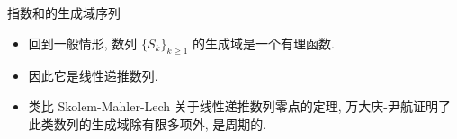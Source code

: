 \documentclass[aspectratio=169,handout]{ctexbeamer}
\begin{document}
\begin{frame}{指数和的生成域序列}
	\begin{itemize}
		\item 回到一般情形, 数列 $\{S_k\}_{k\ge 1}$ 的生成域是一个有理函数.
		\item 因此它是线性递推数列.
		\item 类比 Skolem-Mahler-Lech 关于线性递推数列零点的定理, 万大庆-尹航证明了此类数列的生成域除有限多项外, 是周期的.
	\end{itemize}
\end{frame}
\end{document}
